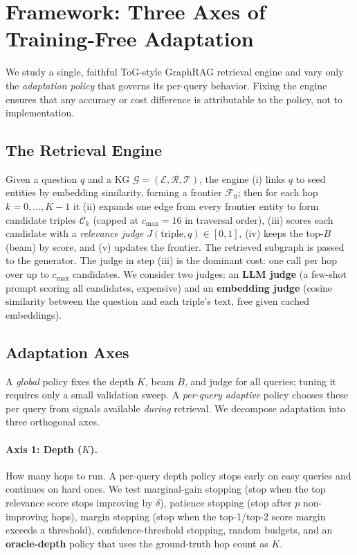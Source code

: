 \section{Framework: Three Axes of Training-Free Adaptation}
\label{sec:method}

We study a single, faithful ToG-style GraphRAG retrieval engine and vary only the \emph{adaptation policy} that governs its per-query behavior. Fixing the engine ensures that any accuracy or cost difference is attributable to the policy, not to implementation.

\subsection{The Retrieval Engine}
Given a question $q$ and a KG $\mathcal{G}=(\mathcal{E},\mathcal{R},\mathcal{T})$, the engine (i) links $q$ to seed entities by embedding similarity, forming a frontier $\mathcal{F}_0$; then for each hop $k=0,\dots,K{-}1$ it (ii) expands one edge from every frontier entity to form candidate triples $\mathcal{C}_k$ (capped at $c_{\max}{=}16$ in traversal order), (iii) scores each candidate with a \emph{relevance judge} $J(\text{triple},q)\in[0,1]$, (iv) keeps the top-$B$ (beam) by score, and (v) updates the frontier. The retrieved subgraph is passed to the generator. The judge in step (iii) is the dominant cost: one call per hop over up to $c_{\max}$ candidates. We consider two judges: an \textbf{LLM judge} (a few-shot prompt scoring all candidates, expensive) and an \textbf{embedding judge} (cosine similarity between the question and each triple's text, free given cached embeddings).

\subsection{Adaptation Axes}
A \emph{global} policy fixes the depth $K$, beam $B$, and judge for all queries; tuning it requires only a small validation sweep. A \emph{per-query adaptive} policy chooses these per query from signals available \emph{during} retrieval. We decompose adaptation into three orthogonal axes.

\paragraph{Axis 1: Depth ($K$).}
How many hops to run. A per-query depth policy stops early on easy queries and continues on hard ones. We test marginal-gain stopping (stop when the top relevance score stops improving by $\delta$), patience stopping (stop after $p$ non-improving hops), margin stopping (stop when the top-1/top-2 score margin exceeds a threshold), confidence-threshold stopping, random budgets, and an \textbf{oracle-depth} policy that uses the ground-truth hop count as $K$.

